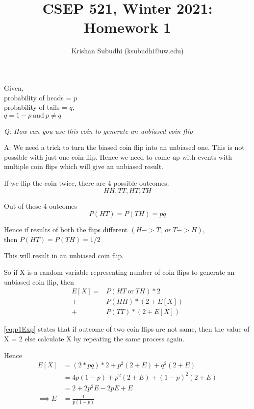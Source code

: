\documentclass{homeworg}
\title{CSEP 521, Winter 2021: Homework 1}
\author{Krishan Subudhi (ksubudhi@uw.edu)}
\begin{document}
\maketitle

\exercise
Given,\\
probability of heads = $p$ \\
probability of tails = $q$,\\
$q = 1 - p \ \text{and}\ p \neq q$

\emph{Q:  How can you use this coin to generate an unbiased coin flip}

A: We need a trick to turn the biased coin flip into an unbiased one. This is not possible with just one coin flip. Hence we need to come up with events with  multiple coin flips which will give an unbiased result.

If we flip the coin twice, there are 4 possible outcomes. 
\[
HH, TT, HT, TH
\]

Out of these 4 outcomes
\[P(HT) = P(TH) = pq\]

Hence if results of both the flips different $(H->T,\ or\  T->H)$,\\
then $ P(HT) = P(TH) = 1/2$   

This will result in an unbiased coin flip. 

So if X is a random variable representing number of coin flips to generate an unbiased coin flip, then 
\begin{equation}
\label{eq:p1Exp}
\begin{split}
    E[X]  = & P(HT\ \text{or}\ TH ) \ast 2 \\
    + & P(HH) \ast (2 + E[X]) \\
    + & P(TT) \ast (2 + E[X])
\end{split}
\end{equation}

\ref{eq:p1Exp} states that if outcome of two coin flips are not same, then the value of X = 2 else calculate X by repeating the same process again.

Hence
\begin{equation}
\begin{split}
    E[X] & = (2 \ast pq) \ast 2 + p^2(2+E) + q^2(2+E) \\
    & = 4 p(1-p) + p^2(2+E) + (1-p)^2(2+E) \\
     & = 2+ 2 p^2E -2pE + E\\
    \implies E & = \frac{1}{p(1-p)}
\end{split}
\end{equation}
\end{document}
